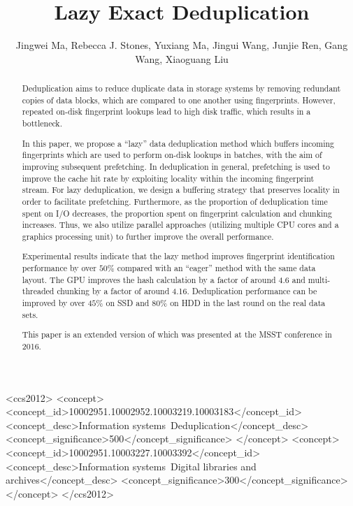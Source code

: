 \documentclass[prodmode,acmtecs]{acmsmall}
\begin{document}

\title{Lazy Exact Deduplication}
\author{Jingwei Ma, Rebecca J. Stones, Yuxiang Ma, Jingui Wang, Junjie Ren, Gang Wang\Envelope, Xiaoguang Liu\Envelope
{}}

\begin{abstract}
Deduplication aims to reduce duplicate data in storage systems by removing redundant copies of data blocks, which are compared to one another using fingerprints.  However, repeated on-disk fingerprint lookups lead to high disk traffic, which results in a bottleneck.

In this paper, we propose a ``lazy'' data deduplication method which buffers incoming fingerprints which are used to perform on-disk lookups in batches, with the aim of improving subsequent prefetching. In deduplication in general, prefetching is used to improve the cache hit rate by exploiting locality within the incoming fingerprint stream. For lazy deduplication, we design a buffering strategy that preserves locality in order to facilitate prefetching.  Furthermore, as the proportion of deduplication time spent on I/O decreases, the proportion spent on fingerprint calculation and chunking increases.  Thus, we also utilize parallel approaches (utilizing multiple CPU cores and a graphics processing unit) to further improve the overall performance.

Experimental results indicate that the lazy method improves fingerprint identification performance by over $50\%$ compared with an ``eager'' method with the same data layout.  The GPU improves the hash calculation by a factor of around 4.6 and multi-threaded chunking by a factor of around 4.16. Deduplication performance can be improved by over $45\%$ on SSD and $80\%$ on HDD in the last round on the real data sets.

This paper is an extended version of \cite{ma2010towards} which was presented at the MSST conference in 2016.
\end{abstract}


%
%
\begin{CCSXML}
<ccs2012>
<concept>
<concept_id>10002951.10002952.10003219.10003183</concept_id>
<concept_desc>Information systems~Deduplication</concept_desc>
<concept_significance>500</concept_significance>
</concept>
<concept>
<concept_id>10002951.10003227.10003392</concept_id>
<concept_desc>Information systems~Digital libraries and archives</concept_desc>
<concept_significance>300</concept_significance>
</concept>
</ccs2012>
\end{CCSXML}
\end{document}

